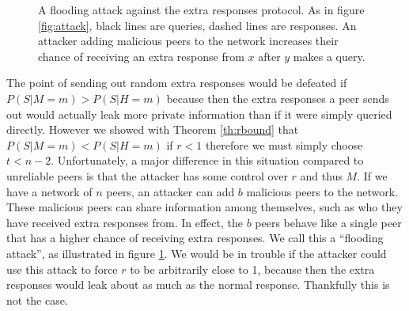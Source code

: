 \documentclass{article}
\newcommand{\thref}[1]{Theorem \ref{th:#1}}
\newcommand{\figref}[1]{figure \ref{fig:#1}}
\begin{document}
\begin{figure}
	\centering
	\caption{A flooding attack against the extra responses protocol. As in \figref{attack},
	black lines are queries, dashed lines are responses. An attacker
	adding malicious peers to the network increases their chance of receiving an
	extra response from $x$ after $y$ makes a query.}
	\label{fig:flood}
\end{figure}

The point of sending out random extra responses would be defeated if
$P(S|M=m)>P(S|H=m)$ because then the extra responses a peer sends out would
actually leak more private information than if it were simply queried directly.
However we showed with \thref{rbound} that $P(S|M=m)<P(S|H=m)$ if $r<1$
therefore we must simply choose
$t<n-2$. Unfortunately, a major difference in this situation compared to
unreliable peers is that the
attacker has some control over $r$ and thus $M$. If we have a network
of $n$ peers, an attacker can add $b$ malicious peers to the network. These
malicious peers can share information among themselves, such as who they have
received extra responses from. In effect, the $b$ peers behave like a single
peer that has a higher chance of receiving extra responses. We call this a
``flooding attack'', as illustrated in \figref{flood}. We would be in trouble if the attacker could use this
attack to force $r$ to be arbitrarily close to 1, because then the extra
responses would leak about as much as the normal response. Thankfully this is
not the case.
\end{document}
